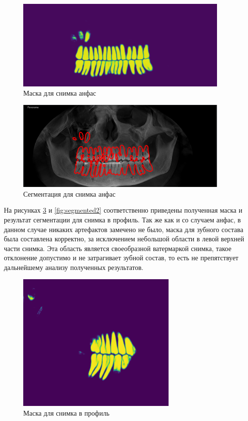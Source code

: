 \begin{figure}[H]
	\centering
	\includegraphics[width=400px]{img/predicted1.png}
	\caption{Маска для снимка анфас}
	\label{fig:predicted1}
\end{figure}

\begin{figure}[H]
	\centering
	\includegraphics[width=400px]{img/segmented1.png}
	\caption{Сегментация для снимка анфас}
	\label{fig:segmented1}
\end{figure}

На рисунках \ref{fig:predicted2} и \ref{fig:segmented2} соответственно приведены полученная маска и результат сегментации для снимка в профиль. Так же как и со случаем анфас, в данном случае никаких артефактов замечено не было, маска для зубного состава была составлена корректно, за исключением небольшой области в левой верхней части снимка. Эта область является своеобразной ватермаркой снимка, такое отклонение допустимо и не затрагивает зубной состав, то есть не препятствует дальнейшему анализу полученных результатов.

\begin{figure}[H]
	\centering
	\includegraphics[width=300px]{img/predicted2.png}
	\caption{Маска для снимка в профиль}
	\label{fig:predicted2}
\end{figure}

